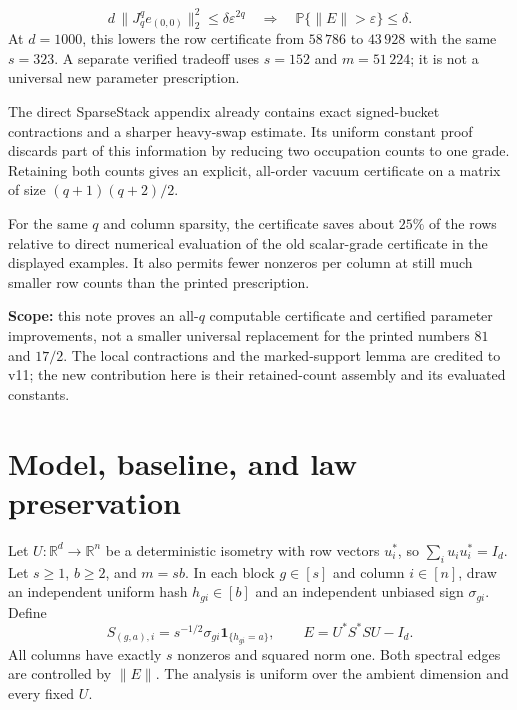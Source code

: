 \documentclass[11pt]{article}
\numberwithin{equation}{section}
\theoremstyle{definition}\newtheorem{definition}[theorem]{Definition}
\theoremstyle{remark}\newtheorem{remark}[theorem]{Remark}
\newcommand{\R}{\mathbb R}\newcommand{\E}{\mathbb E}\newcommand{\Prob}{\mathbb P}
\newcommand{\norm}[1]{\lVert#1\rVert}\newcommand{\ip}[2]{\langle#1,#2\rangle}
\newcommand{\one}{\mathbf1}\newcommand{\F}{\mathbb F}
\begin{document}
\vspace{2mm}
\begin{takeaway}[title={Quantitative endpoint and scope},top=4pt,bottom=4pt]
\small
\setlength{\abovedisplayskip}{4pt}\setlength{\belowdisplayskip}{4pt}
\[
 d\,\|J_q^q e_{(0,0)}\|_2^2\le\delta\varepsilon^{2q}
 \quad\Longrightarrow\quad \Prob\{\|E\|>\varepsilon\}\le\delta.
\]
At $d=1000$, this lowers the row certificate from $58\,786$ to $43\,928$
with the same $s=323$. A separate verified tradeoff uses $s=152$ and
$m=51\,224$; it is not a universal new parameter prescription.
\end{takeaway}
\clearpage
\begin{takeaway}[title=Result and scope]
The direct SparseStack appendix already contains exact signed-bucket contractions and a sharper heavy-swap estimate. Its uniform constant proof discards part of this information by reducing two occupation counts to one grade. Retaining both counts gives an explicit, all-order vacuum certificate on a matrix of size $(q+1)(q+2)/2$.

For the same $q$ and column sparsity, the certificate saves about $25\%$ of the rows relative to direct numerical evaluation of the old scalar-grade certificate in the displayed examples. It also permits fewer nonzeros per column at still much smaller row counts than the printed prescription.

\textbf{Scope:} this note proves an all-$q$ computable certificate and certified parameter improvements, not a smaller universal replacement for the printed numbers $81$ and $17/2$. The local contractions and the marked-support lemma are credited to v11; the new contribution here is their retained-count assembly and its evaluated constants.
\end{takeaway}

\section{Model, baseline, and law preservation}
\label{sec:model}
Let $U:\R^d\to\R^n$ be a deterministic isometry with row vectors $u_i^*$, so $\sum_i u_i u_i^*=I_d$. Let $s\ge1$, $b\ge2$, and $m=sb$. In each block $g\in[s]$ and column $i\in[n]$, draw an independent uniform hash $h_{gi}\in[b]$ and an independent unbiased sign $\sigma_{gi}$. Define
\begin{equation}
 S_{(g,a),i}=s^{-1/2}\sigma_{gi}\one_{\{h_{gi}=a\}},\qquad
 E=U^*S^*SU-I_d.
 \label{eq:model}
\end{equation}
All columns have exactly $s$ nonzeros and squared norm one. Both spectral edges are controlled by $\norm E$. The analysis is uniform over the ambient dimension and every fixed $U$.
\end{document}
